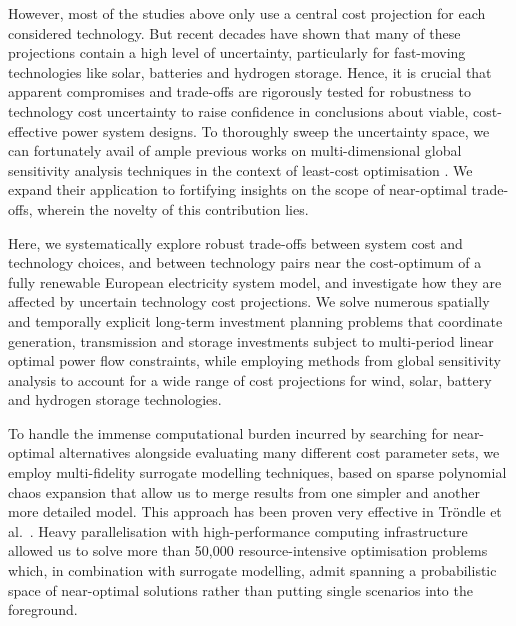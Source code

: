 However, most of the studies above only use a central cost projection for each
considered technology. But recent decades have shown that many of these
projections contain a high level of uncertainty, particularly for fast-moving
technologies like solar, batteries and hydrogen storage. Hence, it is
crucial that apparent compromises and trade-offs are rigorously tested for
robustness to technology cost uncertainty to raise confidence in conclusions
about viable, cost-effective power system designs. To thoroughly sweep the
uncertainty space, we can fortunately avail of ample previous works on
multi-dimensional global sensitivity analysis techniques in the context of
least-cost optimisation \cite{trondle_trade-offs_2020,
mavromatidis_uncertainty_2018, pizarro-alonso_uncertainties_2019,
fais_impact_2016, usher_value_2015}. We expand their application to fortifying
insights on the scope of near-optimal trade-offs, wherein the novelty of this
contribution lies.


Here, we systematically explore robust trade-offs between system
cost and technology choices, and between technology pairs near the cost-optimum
of a fully renewable European electricity system model, and
investigate how they are affected by uncertain technology cost projections. We
solve numerous spatially and temporally explicit long-term investment planning
problems that coordinate generation, transmission and storage investments
subject to multi-period linear optimal power flow constraints, while employing
methods from global sensitivity analysis to account for a wide range of cost
projections for wind, solar, battery and hydrogen storage technologies.


To handle the immense computational burden incurred by searching for
near-optimal alternatives alongside evaluating many different cost parameter
sets, we employ multi-fidelity surrogate modelling techniques, based on sparse
polynomial chaos expansion that allow us to merge results from one simpler and
another more detailed model. This approach has been proven very effective in
Tröndle et al.~\cite{trondle_trade-offs_2020}. Heavy parallelisation with
high-performance computing infrastructure allowed us to solve more than 50,000
resource-intensive optimisation problems which, in combination with surrogate
modelling, admit spanning a probabilistic space of near-optimal solutions rather
than putting single scenarios into the foreground.

